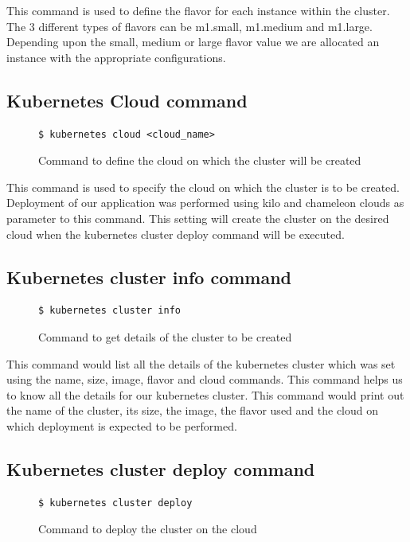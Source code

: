 \documentclass[9pt,twocolumn,twoside]{../../styles/osajnl}
\begin{document}
{This command is used to define the flavor for each instance within the
cluster. The 3 different types of flavors can be m1.small, m1.medium
and m1.large. Depending upon the small, medium or large flavor value
we are allocated an instance with the appropriate configurations.

\subsection{Kubernetes Cloud command}
\begin{figure}[H]
\begin{verbatim}
$ kubernetes cloud <cloud_name>
\end{verbatim}
\caption{Command to define the cloud on which the cluster will be created}
\vspace{-4mm}
\label{Command to define the cloud}
\end{figure}

This command is used to specify the cloud on which the cluster is to
be created. Deployment of our application was performed using kilo
and chameleon clouds as parameter to this command. This setting will
create the cluster on the desired cloud when the kubernetes cluster
deploy command will be executed.

\subsection{Kubernetes cluster info command}

\begin{figure}[H]
\begin{verbatim}
$ kubernetes cluster info
\end{verbatim}
\caption{Command to get details of the cluster to be created}
\vspace{-4mm}
\label{Command to getthe details of the cluster to be created}
\end{figure}

This command would list all the details of the kubernetes cluster
which was set using the name, size, image, flavor and cloud
commands. This command helps us to know all the details for our
kubernetes cluster. This command would print out the name of the
cluster, its size, the image, the flavor used and the cloud on which
deployment is expected to be performed.

\subsection{Kubernetes cluster deploy command}
\begin{figure}[H]
\begin{verbatim}
$ kubernetes cluster deploy
\end{verbatim}
\caption{Command to deploy the cluster on the cloud}
\vspace{-4mm}
\label{Command to deploy the cluster on the cloud}
\end{figure}

}
\end{document}
